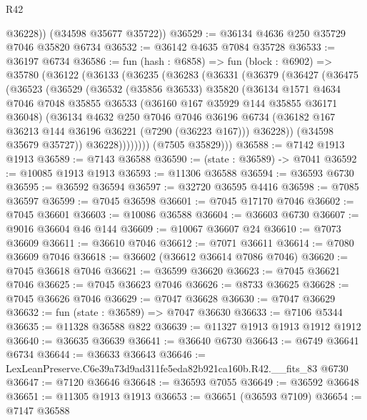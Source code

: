 \begin{lexlean}{R42}
\begin{coremodule}
{          @36228))
      (@34598 @35677 @35722))
@36529 := @36134 @4636 @250 @35729 @7046 @35820 @6734
@36532 := @36142 @4635 @7084 @35728
@36533 := @36197 @6734
@36586 := fun (hash : @6858) =>
  fun (block : @6902) =>
  @35780
    (@36122
      (@36133
        (@36235
          (@36283
            (@36331
              (@36379
                (@36427
                  (@36475
                    (@36523
                      (@36529
                        (@36532
                          (@35856 @36533)
                          @35820
                          (@36134
                            @1571
                            @4634
                            @7046
                            @7048
                            @35855
                            @36533
                            (@36160 @167 @35929 @144 @35855 @36171 @36048)
                            (@36134
                              @4632
                              @250
                              @7046
                              @7046
                              @36196
                              @6734
                              (@36182 @167 @36213 @144 @36196 @36221 (@7290 (@36223 @167)))
                              @36228))
                          (@34598 @35679 @35727))
                        @36228))))))))
        (@7505 @35829)))
@36588 := @7142 @1913 @1913
@36589 := @7143 @36588
@36590 := (state : @36589) -> @7041
@36592 := @10085 @1913 @1913
@36593 := @11306 @36588
@36594 := @36593 @6730
@36595 := @36592 @36594
@36597 := @32720 @36595 @4416
@36598 := @7085 @36597
@36599 := @7045 @36598
@36601 := @7045 @17170 @7046
@36602 := @7045 @36601
@36603 := @10086 @36588
@36604 := @36603 @6730
@36607 := @9016 @36604 @46 @144
@36609 := @10067 @36607 @24
@36610 := @7073 @36609
@36611 := @36610 @7046
@36612 := @7071 @36611
@36614 := @7080 @36609 @7046
@36618 := @36602 (@36612 @36614 @7086 @7046)
@36620 := @7045 @36618 @7046
@36621 := @36599 @36620
@36623 := @7045 @36621 @7046
@36625 := @7045 @36623 @7046
@36626 := @8733 @36625
@36628 := @7045 @36626 @7046
@36629 := @7047 @36628
@36630 := @7047 @36629
@36632 := fun (state : @36589) => @7047 @36630
@36633 := @7106 @5344
@36635 := @11328 @36588 @822
@36639 := @11327 @1913 @1913 @1912 @1912
@36640 := @36635 @36639
@36641 := @36640 @6730
@36643 := @6749 @36641 @6734
@36644 := @36633 @36643
@36646 := LexLeanPreserve.C6e39a73d9ad311fe5eda82b921ca160b.R42.__fits_83 @6730
@36647 := @7120 @36646
@36648 := @36593 @7055
@36649 := @36592 @36648
@36651 := @11305 @1913 @1913
@36653 := @36651 (@36593 @7109)
@36654 := @7147 @36588
}
\end{coremodule}
\end{lexlean}
